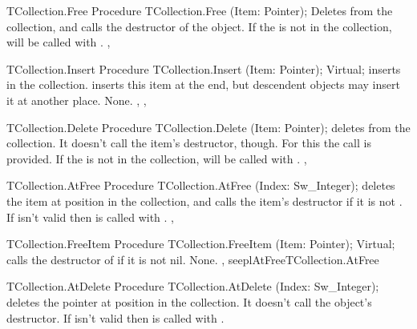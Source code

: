 \begin{procedure}{TCollection.Free}
\Declaration
Procedure TCollection.Free (Item: Pointer);
\Description
{} Deletes  from the collection, and calls the destructor
 of the object.
\Errors
If the  is not in the collection,  will be called with
.
\SeeAlso
{},
\end{procedure}


\begin{procedure}{TCollection.Insert}
\Declaration
Procedure TCollection.Insert (Item: Pointer); Virtual;
\Description
{} inserts  in the collection. 
inserts this item at the end, but descendent objects may insert it at
another place.
\Errors
None.
\SeeAlso
{}, ,
\end{procedure}


\begin{procedure}{TCollection.Delete}
\Declaration
Procedure TCollection.Delete (Item: Pointer);
\Description
{} deletes  from the collection. It doesn't call the
item's destructor, though. For this the 
call is provided.
\Errors
If the  is not in the collection,  will be called with
.
\SeeAlso
{},
\end{procedure}


\begin{procedure}{TCollection.AtFree}
\Declaration
Procedure TCollection.AtFree (Index: Sw\_Integer);
\Description
{} deletes the item at position  in the collection,
and calls the item's destructor if it is not . 
\Errors
If  isn't valid then  is called
with .
\SeeAlso
{}, 
\end{procedure}


\begin{procedure}{TCollection.FreeItem}
\Declaration
Procedure TCollection.FreeItem (Item: Pointer); Virtual;
\Description
{} calls the destructor of  if it is not nil.
\Errors
None.
\SeeAlso
{}, seepl{AtFree}{TCollection.AtFree}
\end{procedure}


\begin{procedure}{TCollection.AtDelete}
\Declaration
Procedure TCollection.AtDelete (Index: Sw\_Integer);
\Description
{} deletes the pointer at position  in the
collection. It doesn't call the object's destructor.
\Errors
If  isn't valid then  is called
with .
\SeeAlso
{}
\end{procedure}


